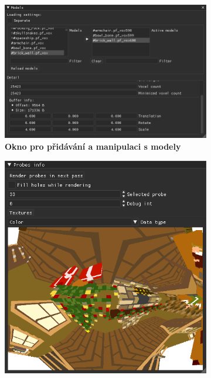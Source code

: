 \begin{figure}[H]
	\centering
	\captionsetup{justification=centering}
	\begin{subfigure}[t]{.49\textwidth}
		\centering
		\includegraphics[scale=1]{images/dp_ui_models.png}
		\caption{\textbf{Okno pro přidávání a manipulaci s modely}}
		\label{fig:model_ui}
	\end{subfigure}
		\begin{subfigure}[t]{.49\textwidth}
		\centering
		\includegraphics[scale=1]{images/dp_ui_probes.png}

\end{subfigure}
\end{figure}
